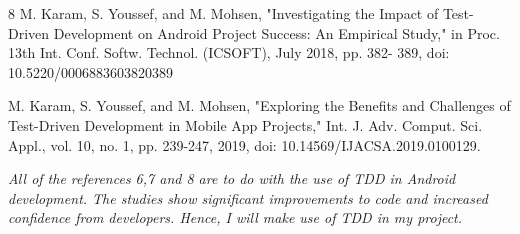 \documentclass[12pt]{article}
\begin{document}
\begin{thebibliography}{8}
    M. Karam, S. Youssef, and M. Mohsen, "Investigating the Impact of Test-Driven Development on Android Project Success: An Empirical Study," in Proc. 13th Int. Conf. Softw. Technol. (ICSOFT), July 2018, pp. 382- 389, doi: 10.5220/0006883603820389

    M. Karam, S. Youssef, and M. Mohsen, "Exploring the Benefits and Challenges of Test-Driven Development in Mobile App Projects," Int. J. Adv. Comput. Sci. Appl., vol. 10, no. 1, pp. 239-247, 2019, doi: 10.14569/IJACSA.2019.0100129.

    \textit{All of the references 6,7 and 8 are to do with the use of TDD in Android development. The studies show significant improvements to code and increased confidence from developers. Hence, I will make use of TDD in my project.}


    
\end{thebibliography}
\end{document}
